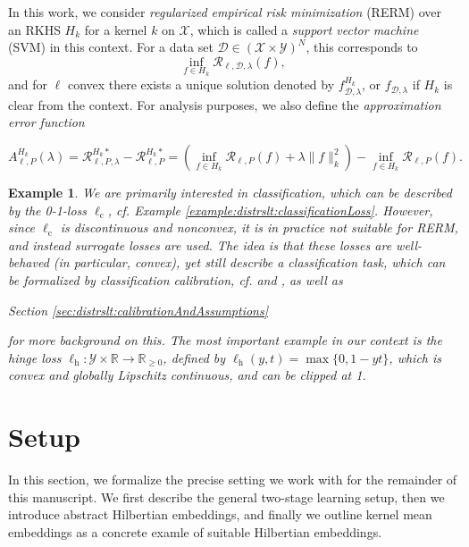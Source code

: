 \documentclass[letterpaper]{article} %
\newcommand{\R}{\mathbb{R}}
\newcommand{\Rnn}{\R_{\geq 0}}
\newcommand{\inputSet}{\mathcal{X}} %
\newcommand{\outputSet}{\mathcal{Y}} %
\newcommand{\dataSet}{\mathcal{D}}
\newcommand{\svm}[2]{f_{{#2},{#1}}} %
\newcommand{\risk}{\mathcal{R}} %
\newcommand{\Risk}[2]{\risk_{{#1},{#2}}} %
\newcommand{\RiskReg}[3]{\risk_{{#1},{#2},{#3}}} %
\newcommand{\RiskRegOpt}[4]{\risk_{{#1},{#2},{#3}}^{#4\ast}} %
\newcommand{\ApproxErrorFunc}[3]{A^{#3}_{#1,#2}}
\newcommand{\RiskOpt}[3]{\Risk{#1}{#2}^{#3\ast}}
\newcommand{\defm}[1]{\emph{#1}}
\newcommand{\ellClass}{\ell_{\mathrm{c}}} %
\newcommand{\ellHinge}{\ell_{\mathrm{h}}} %
\newtheorem{example}[theorem]{Example}
\newif\ifNotMuchSpace
\newif\ifCameraReady
\begin{document}
In this work, we consider \defm{regularized empirical risk minimization} (RERM) over an RKHS $H_k$ for a kernel $k$ on $\inputSet$, which is called a \defm{support vector machine} (SVM) in this context.
For a data set $\dataSet\in(\inputSet\times\outputSet)^N$, this corresponds to
\begin{equation*}
    \inf_{f \in H_k} \RiskReg{\ell}{\dataSet}{\lambda}(f),
\end{equation*}
and for $\ell$ convex there exists a unique solution denoted by $\svm{\lambda}{\dataSet}^{H_k}$, or $\svm{\lambda}{\dataSet}$ if $H_k$ is clear from the context.
For analysis purposes, we also define the \defm{approximation error function}
\ifNotMuchSpace
$\ApproxErrorFunc{\ell}{P}{H_k}(\lambda)=\RiskRegOpt{\ell}{P}{\lambda}{H_k} - \RiskOpt{\ell}{P}{H_k}$.
\else
\begin{equation*}
    \ApproxErrorFunc{\ell}{P}{H_k}(\lambda)=\RiskRegOpt{\ell}{P}{\lambda}{H_k} - \RiskOpt{\ell}{P}{H_k}
    = \left(\inf_{f\in H_k} \Risk{\ell}{P}(f) + \lambda\|f\|_k^2 \right) - \inf_{f \in H_k} \Risk{\ell}{P}(f).
\end{equation*}
\fi
\begin{example} \label{example:distrslt:hingeLoss}
We are primarily interested in classification, which can be described by the 0-1-loss $\ellClass$, cf. Example \ref{example:distrslt:classificationLoss}.
However, since $\ellClass$ is discontinuous and nonconvex, it is in practice not suitable for RERM, and instead \defm{surrogate losses} are used.
The idea is that these losses are well-behaved (in particular, convex), yet still describe a classification task, which can be formalized by \defm{classification calibration}, cf. \cite[Chapters~2,3]{SC08} and \cite[Chapter~4]{bach2024learning}, as well as 
\ifCameraReady
the supplementary material
\else
Section \ref{sec:distrslt:calibrationAndAssumptions} 
\fi
for more background on this.
The most important example in our context is the \defm{hinge loss} $\ellHinge: \outputSet\times\R\rightarrow\Rnn$,
defined by $\ellHinge(y,t)=\max\{0, 1-yt\}$, which is convex and globally Lipschitz continuous, and can be clipped at 1.
\end{example}

\section{Setup} \label{sec:distrslt:setup}
In this section, we formalize the precise setting we work with for the remainder of this manuscript.
We first describe the general two-stage learning setup,
then we introduce abstract Hilbertian embeddings, and finally we outline kernel mean embeddings as a concrete examle of suitable Hilbertian embeddings.
\end{document}
